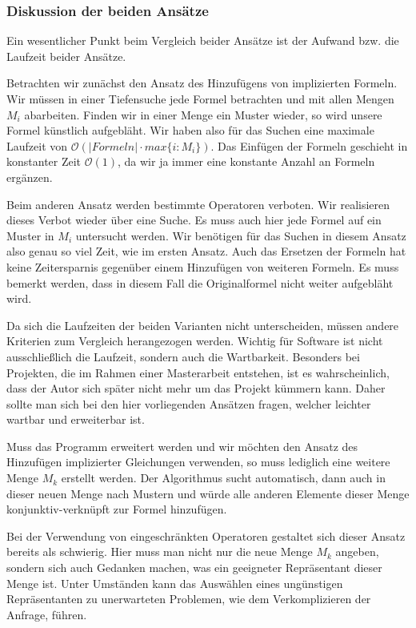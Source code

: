 \subsubsection{Diskussion der beiden Ansätze}

Ein wesentlicher Punkt beim Vergleich beider Ansätze ist der Aufwand bzw. die Laufzeit beider Ansätze. 

Betrachten wir zunächst den Ansatz des Hinzufügens von implizierten Formeln. Wir müssen in einer Tiefensuche jede Formel betrachten und mit allen Mengen $M_i$ abarbeiten. Finden wir in einer Menge ein Muster wieder, so wird unsere Formel künstlich aufgebläht. Wir haben also für das Suchen eine maximale Laufzeit von $\mathcal{O}(\mathit{\vert Formeln\vert \cdot max\{i : M_i\}})$. Das Einfügen der Formeln geschieht in konstanter Zeit $\mathcal{O}(1)$, da wir ja immer eine konstante Anzahl an Formeln ergänzen.

Beim anderen Ansatz werden bestimmte Operatoren verboten. Wir realisieren dieses Verbot wieder über eine Suche. Es muss auch hier jede Formel auf ein Muster in $M_i$ untersucht werden. Wir benötigen für das Suchen in diesem Ansatz also genau so viel Zeit, wie im ersten Ansatz. Auch das Ersetzen der Formeln hat keine Zeitersparnis gegenüber einem Hinzufügen von weiteren Formeln. Es muss bemerkt werden, dass in diesem Fall die Originalformel nicht weiter aufgebläht wird.

Da sich die Laufzeiten der beiden Varianten nicht unterscheiden, müssen andere Kriterien zum Vergleich herangezogen werden. Wichtig für Software ist nicht ausschließlich die Laufzeit, sondern auch die Wartbarkeit. Besonders bei Projekten, die im Rahmen einer Masterarbeit entstehen, ist es wahrscheinlich, dass der Autor sich später nicht mehr um das Projekt kümmern kann. Daher sollte man sich bei den hier vorliegenden Ansätzen fragen, welcher leichter wartbar und erweiterbar ist.

Muss das Programm erweitert werden und wir möchten den Ansatz des Hinzufügen implizierter Gleichungen verwenden, so muss lediglich eine weitere Menge $M_k$ erstellt werden. Der Algorithmus sucht automatisch, dann auch in dieser neuen Menge nach Mustern und würde alle anderen Elemente dieser Menge konjunktiv-verknüpft zur Formel hinzufügen. 

Bei der Verwendung von eingeschränkten Operatoren gestaltet sich dieser Ansatz bereits als schwierig. Hier muss man nicht nur die neue Menge $M_k$ angeben, sondern sich auch Gedanken machen, was ein geeigneter Repräsentant dieser Menge ist. Unter Umständen kann das Auswählen eines ungünstigen Repräsentanten zu unerwarteten Problemen, wie dem Verkomplizieren der Anfrage, führen.

